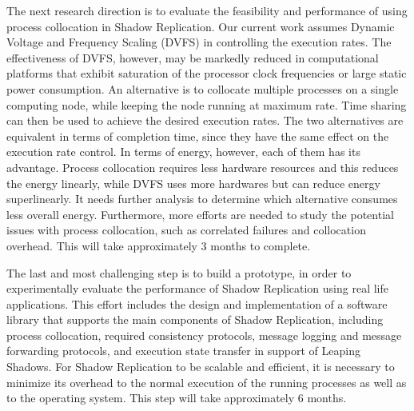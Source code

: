 The next research direction is to evaluate the feasibility and performance of using process collocation in Shadow Replication. Our current work assumes Dynamic Voltage and Frequency Scaling (DVFS) in controlling the execution rates. The effectiveness of DVFS, however, may be markedly reduced in computational platforms that exhibit saturation of the processor clock frequencies or large static power consumption. An alternative is to collocate multiple processes on a single computing node, while keeping the node running at maximum rate. Time sharing can then be used to achieve the desired execution rates.
%
The two alternatives are equivalent in terms of completion time, since they have the same effect on the execution rate control. In terms of energy, however, each of them has its advantage. Process collocation requires less hardware resources and this reduces the energy linearly, while DVFS uses more hardwares but can reduce energy superlinearly. It needs further analysis to determine which alternative consumes less overall energy. Furthermore, more efforts are needed to study the potential issues with process collocation, such as correlated failures and collocation overhead. This will take approximately 3 months to complete. 

The last and most challenging step is to build a prototype, in order to experimentally evaluate the performance of Shadow Replication using real life applications. This effort includes the design and implementation of a software library that supports the main components of Shadow Replication, including process collocation, required consistency protocols, message logging and message forwarding protocols, and execution state transfer in support of Leaping Shadows. For Shadow Replication to be scalable and efficient, it is necessary to minimize its overhead to the normal execution of the running processes as well as to the operating system. This step will take approximately 6 months. 




